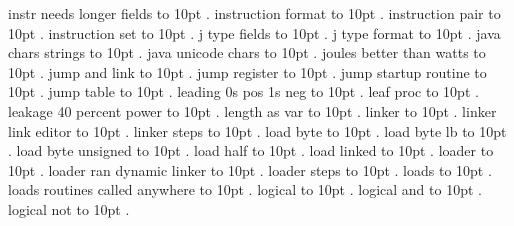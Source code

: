 \smallskip
instr needs longer fields \leaders\hbox to 10pt {\hss.\hss}  \hfill {}
\smallskip
instruction format \leaders\hbox to 10pt {\hss.\hss}  \hfill {}
\smallskip
instruction pair \leaders\hbox to 10pt {\hss.\hss}  \hfill {}
\smallskip
instruction set \leaders\hbox to 10pt {\hss.\hss}  \hfill {}
\smallskip
j type fields \leaders\hbox to 10pt {\hss.\hss}  \hfill {}
\smallskip
j type format \leaders\hbox to 10pt {\hss.\hss}  \hfill {}
\smallskip
java chars strings \leaders\hbox to 10pt {\hss.\hss}  \hfill {}
\smallskip
java unicode chars \leaders\hbox to 10pt {\hss.\hss}  \hfill {}
\smallskip
joules better than watts \leaders\hbox to 10pt {\hss.\hss}  \hfill {}
\smallskip
jump and link \leaders\hbox to 10pt {\hss.\hss}  \hfill {}
\smallskip
jump register \leaders\hbox to 10pt {\hss.\hss}  \hfill {}
\smallskip
jump startup routine \leaders\hbox to 10pt {\hss.\hss}  \hfill {}
\smallskip
jump table \leaders\hbox to 10pt {\hss.\hss}  \hfill {}
\smallskip
leading 0s pos 1s neg \leaders\hbox to 10pt {\hss.\hss}  \hfill {}
\smallskip
leaf proc \leaders\hbox to 10pt {\hss.\hss}  \hfill {}
\smallskip
leakage 40 percent power \leaders\hbox to 10pt {\hss.\hss}  \hfill {}
\smallskip
length as var \leaders\hbox to 10pt {\hss.\hss}  \hfill {}
\smallskip
linker \leaders\hbox to 10pt {\hss.\hss}  \hfill {}
\smallskip
linker link editor \leaders\hbox to 10pt {\hss.\hss}  \hfill {}
\smallskip
linker steps \leaders\hbox to 10pt {\hss.\hss}  \hfill {}
\smallskip
load byte \leaders\hbox to 10pt {\hss.\hss}  \hfill {}
\smallskip
load byte lb \leaders\hbox to 10pt {\hss.\hss}  \hfill {}
\smallskip
load byte unsigned \leaders\hbox to 10pt {\hss.\hss}  \hfill {}
\smallskip
load half \leaders\hbox to 10pt {\hss.\hss}  \hfill {}
\smallskip
load linked \leaders\hbox to 10pt {\hss.\hss}  \hfill {}
\smallskip
loader \leaders\hbox to 10pt {\hss.\hss}  \hfill {}
\smallskip
loader ran dynamic linker \leaders\hbox to 10pt {\hss.\hss}  \hfill {}
\smallskip
loader steps \leaders\hbox to 10pt {\hss.\hss}  \hfill {}
\smallskip
loads \leaders\hbox to 10pt {\hss.\hss}  \hfill {}
\smallskip
loads routines called anywhere \leaders\hbox to 10pt {\hss.\hss}  \hfill {}
\smallskip
logical \leaders\hbox to 10pt {\hss.\hss}  \hfill {}
\smallskip
logical and \leaders\hbox to 10pt {\hss.\hss}  \hfill {}
\smallskip
logical not \leaders\hbox to 10pt {\hss.\hss}  \hfill {}
